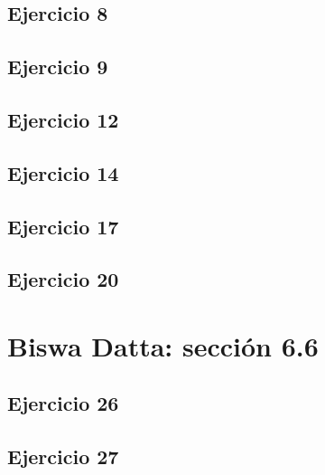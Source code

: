 \documentclass[12pt]{article}
\begin{document}
\subsection{Ejercicio 8}

\subsection{Ejercicio 9}

\subsection{Ejercicio 12}

\subsection{Ejercicio 14}

\subsection{Ejercicio 17}

\subsection{Ejercicio 20}

%
\section{Biswa Datta: sección 6.6}

\subsection{Ejercicio 26}

\subsection{Ejercicio 27}

\end{document}
